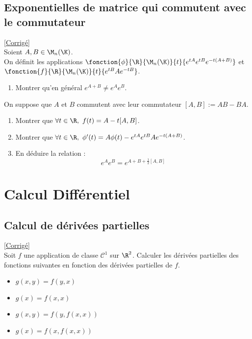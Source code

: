 \documentclass{book}
\begin{document}
\section{Exponentielles de matrice qui commutent avec le commutateur}
\textcolor{blue}{\hyperref[Exponentielles de matrices qui commutent avec leur commutateur corrigé]{[Corrigé]}}\\
\label{Exponentielles de matrices qui commutent avec leur commutateur}
Soient $A,B\in \M_n(\K)$.\\
On définit les applications $\fonction{\phi}{\R}{\M_n(\K)}{t}{e^{tA}e^{tB}e^{-t(A+B)}}$ et $\fonction{f}{\R}{\M_n(\K)}{t}{e^{tB}Ae^{-tB}}$.
\begin{enumerate}
	\item Montrer qu'en général $e^{A+B}\ne e^Ae^B$.
\end{enumerate}
On suppose que $A$ et $B$ commutent avec leur commutateur $[A,B]:=AB-BA$.
\begin{enumerate}[resume]
	\item Montrer que $\forall t\in \R,\ f(t)=A-t[A,B]$.
	\item Montrer que $\forall t\in \R,\ \phi'(t)=A\phi(t)-e^{tA}e^{tB}Ae^{-t(A+B)}$.
	\item En déduire la relation :
	$$e^Ae^B=e^{A+B+\frac{1}{2}[A,B]}$$
\end{enumerate}


\chapter{Calcul Différentiel}
\section{Calcul de dérivées partielles}
\textcolor{blue}{\hyperref[Calcul de dérivées partielles corrigé]{[Corrigé]}}\\
\label{Calcul de dérivées partielles}
Soit $f$ une application de classe $\mathcal{C}^1$ sur $\R^2$. Calculer les dérivées partielles des fonctions suivantes en fonction des dérivées partielles de $f$.
\begin{itemize}
	\item $g(x,y)=f(y,x)$
	\item $g(x)=f(x,x)$
	\item $g(x,y)=f(y,f(x,x))$
	\item $g(x)=f(x,f(x,x))$
\end{itemize}
\end{document}
